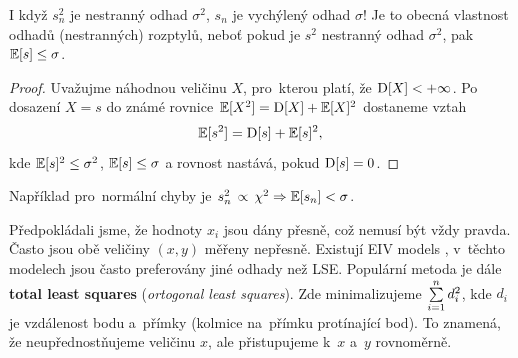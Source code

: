 \begin{center}

\end{center}

\begin{remark}
I když $s^2_n$ je nestranný odhad $\sigma^2$, $s_n$ je vychýlený odhad $\sigma$!
Je to obecná vlastnost odhadů (nestranných) rozptylů, neboť pokud je $s^2$ nestranný odhad $\sigma^2$, pak $\mathbb{E}[s] \leq \sigma$.
\end{remark}
\begin{proof}
Uvažujme náhodnou veličinu $X$, pro~kterou platí, že $\mathrm{D} [X] < + \infty$. Po dosazení $X = s$ do známé rovnice $ \mathbb{E} [X^2] = \mathrm{D} [X] +  \mathbb{E} [X]^2$ dostaneme vztah $$\mathbb{E} [s^2] = \mathrm{D} [s] +  \mathbb{E} [s]^2,$$ kde $\mathbb{E} [s]^2 \leq \sigma^2$, $\mathbb{E} [s] \leq \sigma$ a rovnost nastává, pokud $\mathrm{D} [s] = 0$.

\end{proof}
Například pro~normální chyby je $s_n^2 \, \propto \, \chi^2 \Rightarrow \mathbb{E} [s_n] < \sigma$.

\begin{remark}
Předpokládali jsme, že hodnoty $x_i$ jsou dány přesně, což nemusí být vždy pravda. Často jsou obě veličiny $(x,y)$ měřeny nepřesně. Existují EIV models , v~těchto modelech jsou často preferovány jiné odhady než LSE. Populární metoda je dále \textbf{total least squares} (\textit{ortogonal least squares}). Zde minimalizujeme $\sum\limits_{i=1}^{n} d_i^2$, kde $d_i$ je vzdálenost bodu a~přímky (kolmice na~přímku protínající bod). To znamená, že neupřednostňujeme veličinu $x$, ale přistupujeme k~$x$ a~$y$ rovnoměrně.
\end{remark}

